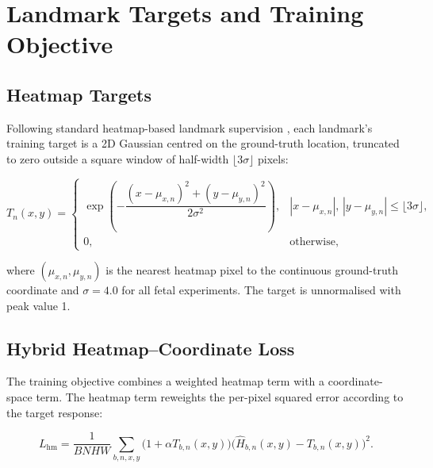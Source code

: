 
\section{Landmark Targets and Training Objective}
\label{sec:method-objective}


\subsection{Heatmap Targets}
\label{sec:method-targets}

Following standard heatmap-based landmark supervision
\parencite{tompson2014joint,newell2016hourglass}, each landmark's
training target is a 2D Gaussian centred on the ground-truth
location, truncated to zero outside a square window of half-width
$\lfloor 3\sigma \rfloor$ pixels:

\begin{equation}
  \label{eq:gaussian-target}
  T_n(x,y) =
  \begin{cases}
    \exp\!\left(
      -\dfrac{
        (x-\mu_{x,n})^2 + (y-\mu_{y,n})^2
      }{2\sigma^2}
    \right),
    &
    |x-\mu_{x,n}|,\,
    |y-\mu_{y,n}|
    \le
    \lfloor 3\sigma \rfloor,
    \\[4pt]
    0,
    &
    \text{otherwise},
  \end{cases}
\end{equation}

where $(\mu_{x,n},\mu_{y,n})$ is the nearest heatmap pixel to the
continuous ground-truth coordinate and $\sigma=4.0$ for all fetal
experiments. The target is unnormalised with peak value 1.


\subsection{Hybrid Heatmap--Coordinate Loss}
\label{sec:method-losses}

The training objective combines a weighted heatmap term with a
coordinate-space term. The heatmap term reweights the per-pixel
squared error according to the target response:

\begin{equation}
  \label{eq:wmse}
  L_{\text{hm}}
  =
  \frac{1}{BNHW}
  \sum_{b,n,x,y}
  \bigl(1+\alpha T_{b,n}(x,y)\bigr)
  \bigl(
    \hat{H}_{b,n}(x,y)-T_{b,n}(x,y)
  \bigr)^2 .
\end{equation}

